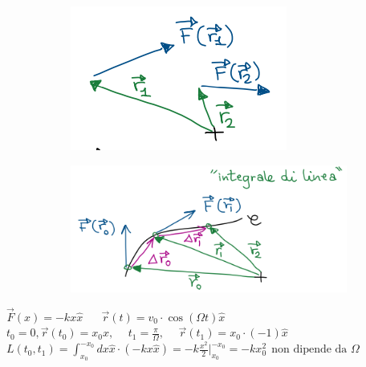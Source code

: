 \begin{figure}[h!]
    \centering
    \begin{subfigure}{0.3\textwidth}
        \centering
        \includegraphics[width=\textwidth]{images/ess-energia1.png}
    \end{subfigure}
    \hspace{15pt}
    \begin{subfigure}{0.4\textwidth}
        \centering
        \includegraphics[width=\textwidth]{images/ess-energia-2.png}
    \end{subfigure}
\end{figure}
\begin{example}
    $\vec{F}(x)= -kx\hat{x} \hspace{20pt} \vec{r}(t) = v_0 \cdot \cos(\Omega t)\hat{x}$\\
    $t_0 = 0, \vec{r}(t_0) = x_0 \hat{x}, \hspace{15pt} t_1 = \frac{\pi}{\Omega}, \hspace{15pt} \vec{r}(t_1) = x_0 \cdot (-1)\hat{x}$\\
    $L(t_0, t_1) = \int_{x_0}^{-x_0}dx \hat{x} \cdot (-kx\hat{x}) = -k \frac{x^2}{2} |_{x_0}^{-x_0} = -k x_0^2 \:\: \text{non dipende da }\Omega$
\end{example}
